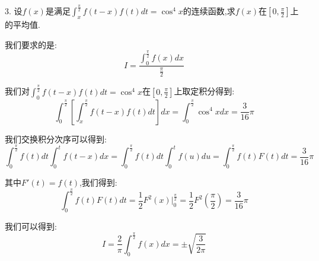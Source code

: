 3. 设$f(x)$是满足$\int_{x}^{\frac{\pi}{2}}f(t-x)f(t)dt=\cos^4 x$的连续函数,求$f(x)$在$[0,\frac{\pi}{2}]$上的平均值.
\begin{solution}
	
	我们要求的是: $$I=\dfrac{\int_{0}^{\frac{\pi}{2}}f(x)dx}{\frac{\pi}{2}}$$
	
	我们对$\int_{0}^{\frac{\pi}{2}}f(t-x)f(t)dt=\cos^4 x$在$[0,\frac{\pi}{2}]$上取定积分得到: 
	$$\int_{0}^{\frac{\pi}{2}}\left[ \int_{x}^{\frac{\pi}{2}}f(t-x)f(t)dt\right] dx=\int_{0}^{\frac{\pi}{2}}\cos^4 xdx=\dfrac{3}{16}\pi$$
	
	我们交换积分次序可以得到: 
	$$\int_{0}^{\frac{\pi}{2}}f(t)dt\int_{0}^{t}f(t-x)dx=\int_{0}^{\frac{\pi}{2}}f(t)dt\int_{0}^{t}f(u)du=\int_{0}^{\frac{\pi}{2}}f(t)F(t)dt=\dfrac{3}{16}\pi$$
	
	其中$F'(t)=f(t)$,我们得到: 
	$$\int_{0}^{\frac{\pi}{2}}f(t)F(t)dt=\dfrac{1}{2}F^{2}(x)|_{0}^{\frac{\pi}{2}}=\dfrac{1}{2}F^2(\frac{\pi}{2})=\dfrac{3}{16}\pi$$
	
	我们可以得到: 
	$$I=\dfrac{2}{\pi}\int_{0}^{\frac{\pi}{2}}f(x)dx=\pm\sqrt{\dfrac{3}{2\pi}}$$
\end{solution}

